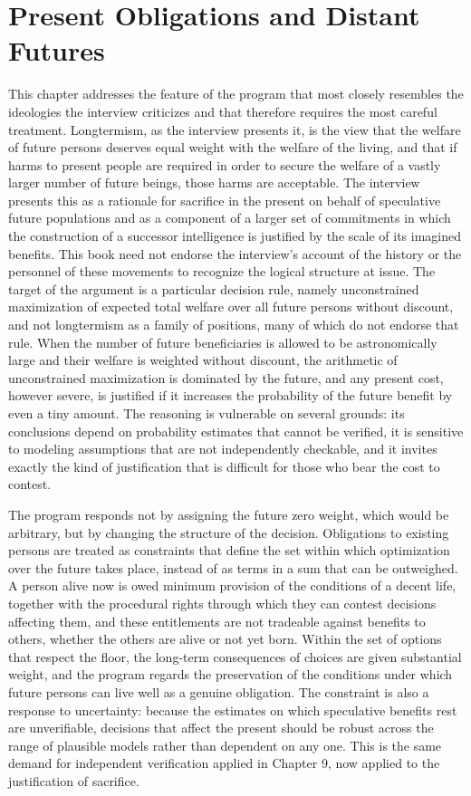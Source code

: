 \chapter{Present Obligations and Distant Futures}
\label{ch:31}

This chapter addresses the feature of the program that most closely resembles the ideologies the interview criticizes and that therefore requires the most careful treatment. Longtermism, as the interview presents it, is the view that the welfare of future persons deserves equal weight with the welfare of the living, and that if harms to present people are required in order to secure the welfare of a vastly larger number of future beings, those harms are acceptable. The interview presents this as a rationale for sacrifice in the present on behalf of speculative future populations and as a component of a larger set of commitments in which the construction of a successor intelligence is justified by the scale of its imagined benefits. This book need not endorse the interview's account of the history or the personnel of these movements to recognize the logical structure at issue. The target of the argument is a particular decision rule, namely unconstrained maximization of expected total welfare over all future persons without discount, and not longtermism as a family of positions, many of which do not endorse that rule. When the number of future beneficiaries is allowed to be astronomically large and their welfare is weighted without discount, the arithmetic of unconstrained maximization is dominated by the future, and any present cost, however severe, is justified if it increases the probability of the future benefit by even a tiny amount. The reasoning is vulnerable on several grounds: its conclusions depend on probability estimates that cannot be verified, it is sensitive to modeling assumptions that are not independently checkable, and it invites exactly the kind of justification that is difficult for those who bear the cost to contest.

The program responds not by assigning the future zero weight, which would be arbitrary, but by changing the structure of the decision. Obligations to existing persons are treated as constraints that define the set within which optimization over the future takes place, instead of as terms in a sum that can be outweighed. A person alive now is owed minimum provision of the conditions of a decent life, together with the procedural rights through which they can contest decisions affecting them, and these entitlements are not tradeable against benefits to others, whether the others are alive or not yet born. Within the set of options that respect the floor, the long-term consequences of choices are given substantial weight, and the program regards the preservation of the conditions under which future persons can live well as a genuine obligation. The constraint is also a response to uncertainty: because the estimates on which speculative benefits rest are unverifiable, decisions that affect the present should be robust across the range of plausible models rather than dependent on any one. This is the same demand for independent verification applied in Chapter 9, now applied to the justification of sacrifice.

